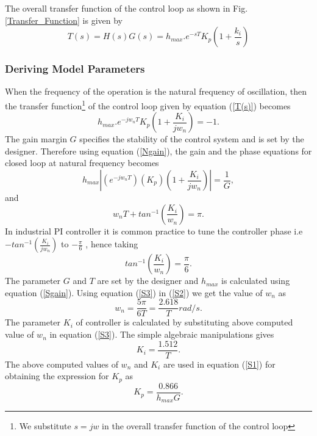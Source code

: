 \documentclass[journal]{IEEEtran}
\begin{document}
The overall transfer function of the control loop as shown in Fig. \ref{Transfer_Function} is given by 
\begin{equation}
	\label{T(s)}
	T(s)=H(s)G(s)=h_{max}.e^{-sT}K_p(1+\frac{k_i}{s})
\end{equation} 
\subsubsection{Deriving Model Parameters} 
When the frequency of the operation is the natural frequency of oscillation, then the transfer function\footnote{We substitute $s=jw$ in the overall transfer function of the control loop } of the control loop given by equation (\ref{T(s)}) becomes
\begin{equation}
	\label{Ngain}
	h_{max}.e^{-jw_nT}K_p(1+\frac{K_i}{jw_n})=-1.
\end{equation}
The gain margin $G$ specifies the stability of the control system and is set by the designer. Therefore using equation (\ref{Ngain}), the gain and the phase equations for closed loop at natural frequency becomes
\begin{equation}
	\label{S1}
	h_{max}|(e^{-jw_nT})(K_p)(1+\frac{K_i}{jw_n})|=\frac{1}{G},
\end{equation}
and
\begin{equation}
	\label{S2}
	w_nT+tan^{-1}(\frac{K_i}{w_n})=\pi.
\end{equation}
In industrial PI controller it is common practice to tune the controller phase i.e $-tan^{-1}(\frac{K_i}{jw_n})$ to $-\frac{\pi}{6}$ \cite{Pcontrol}\cite{cntrol}, hence taking
\begin{equation}
	\label{S3}
	tan^{-1}(\frac{K_i}{w_n})=\frac{\pi}{6}.
\end{equation}
The parameter $G$ and $T$ are set by the designer and $h_{max}$ is calculated using equation (\ref{Sgain}). Using equation (\ref{S3}) in (\ref{S2}) we get the value of $w_n$ as
\begin{equation}
	\nonumber
	w_n=\frac{5\pi}{6T}=\frac{2.618}{T}rad/s.
\end{equation} 
The parameter $K_i$ of controller is calculated by substituting above computed value of $w_n$ in equation (\ref{S3}). The simple algebraic manipulations gives
\begin{equation}
	\nonumber
	K_i=\frac{1.512}{T}.
\end{equation}
The above computed values of $w_n$ and $K_i$ are used in equation (\ref{S1}) for obtaining the expression for $K_p$ as
\begin{equation}
	\nonumber
	K_p=\frac{0.866}{h_{max}G}.
\end{equation}
\end{document}

